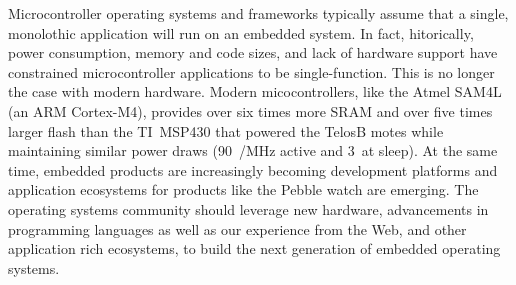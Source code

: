 Microcontroller operating systems and frameworks typically assume that a single,
monolothic application will run on an embedded system. In fact, hitorically,
power consumption, memory and code sizes, and lack of hardware support have
constrained microcontroller applications to be single-function. This is no
longer the case with modern hardware. Modern micocontrollers, like the Atmel
SAM4L (an ARM Cortex-M4), provides over six times more SRAM and over five times
larger flash than the TI~MSP430 that powered the TelosB motes while maintaining
similar power draws (90~{\uA}/MHz active and 3~\uA at sleep). At the same
time, embedded products are increasingly becoming development platforms and
application ecosystems for products like the Pebble watch are emerging. The
operating systems community should leverage new hardware, advancements in
programming languages as well as our experience from the Web, and other
application rich ecosystems, to build the next generation of embedded operating
systems.

